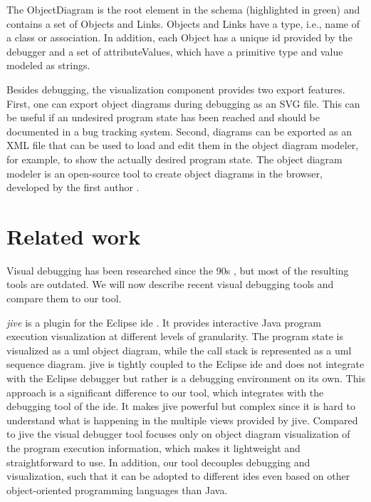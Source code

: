 \documentclass[conference]{IEEEtran}
\begin{document}
The \textsf{ObjectDiagram} is the root element in the schema (highlighted in green) and contains a set of \textsf{Objects} and \textsf{Links}.
\textsf{Objects} and \textsf{Links} have a \textsf{type}, i.e., name of a class or association.
In addition, each \textsf{Object} has a unique \textsf{id} provided by the debugger and a set of \textsf{attributeValues}, which have a primitive \textsf{type} and \textsf{value} modeled as strings.

Besides debugging, the visualization component provides two export features.
First, one can export object diagrams during debugging as an SVG file.
This can be useful if an undesired program state has been reached and should be documented in a bug tracking system.
Second, diagrams can be exported as an XML file that can be used to load and edit them in the object diagram modeler, for example, to show the actually desired program state.
The object diagram modeler is an open-source tool to create object diagrams in the browser, developed by the first author \cite{ObjectDiagramModeler2022}.

\section{Related work} \label{sec:relatedWork}
Visual debugging has been researched since the 90s \cite{baeza-yatesVisualDebuggingAutomatic1996, jerdingUsingVisualizationFoster1994, mukherjeaVisualDebuggingIntegrating1994, hansonSimpleExtensibleGraphical1997}, but most of the resulting tools are outdated.
We will now describe recent visual debugging tools and compare them to our tool.

\textit{\gls*{jive}} is a plugin for the Eclipse \gls*{ide} \cite{czyzDeclarativeVisualDebugging2007,k.p.FiniteStateModel2021, JIVEJavaInteractive}.
It provides interactive Java program execution visualization at different levels of granularity.
The program state is visualized as a \gls*{uml} object diagram, while the call stack is represented as a \gls*{uml} sequence diagram.
\gls*{jive} is tightly coupled to the Eclipse \gls*{ide} and does not integrate with the Eclipse debugger but rather is a debugging environment on its own.
This approach is a significant difference to our tool, which integrates with the debugging tool of the \gls*{ide}.
It makes \gls*{jive} powerful but complex since it is hard to understand what is happening in the multiple views provided by \gls*{jive}.
Compared to \gls*{jive} the visual debugger tool focuses only on object diagram visualization of the program execution information, which makes it lightweight and straightforward to use.
In addition, our tool decouples debugging and visualization, such that it can be adopted to different \glspl*{ide} even based on other object-oriented programming languages than Java.
\end{document}
